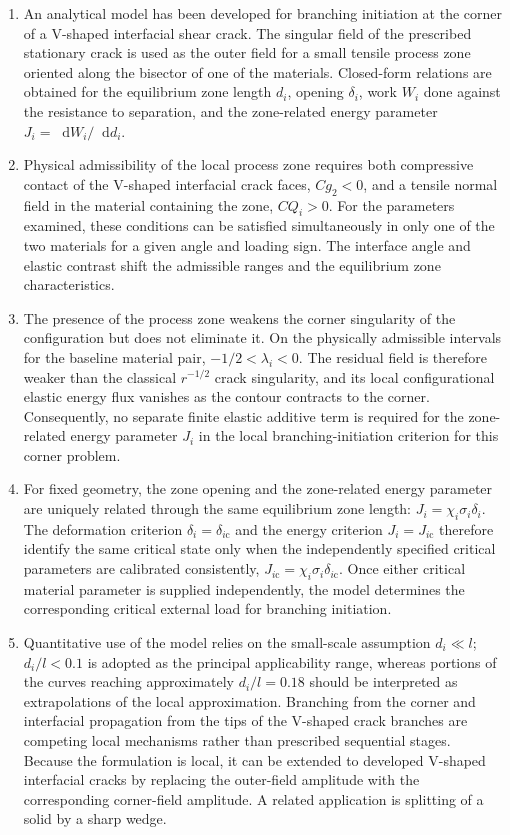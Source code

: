 \documentclass[pdflatex,iicol,sn-mathphys-ay]{sn-jnl}
\newcommand{\dd}{\mathop{}\!\mathrm{d}}
\begin{document}
\begin{enumerate}
\item
An analytical model has been developed for branching initiation at the
corner of a V-shaped interfacial shear crack. The singular field of the
prescribed stationary crack is used as the outer field for a small tensile
process zone oriented along the bisector of one of the materials.
Closed-form relations are obtained for the equilibrium zone length $d_i$,
opening $\delta_i$, work $W_i$ done against the resistance to separation,
and the zone-related energy parameter $J_i=\dd W_i/\dd d_i$.

\item
Physical admissibility of the local process zone requires both compressive
contact of the V-shaped interfacial crack faces, $Cg_2<0$, and a tensile
normal field in the material containing the zone, $CQ_i>0$. For the
parameters examined, these conditions can be satisfied simultaneously in
only one of the two materials for a given angle and loading sign. The
interface angle and elastic contrast shift the admissible ranges and the
equilibrium zone characteristics.

\item
The presence of the process zone weakens the corner singularity of the
configuration but does not eliminate it. On the physically admissible intervals for the baseline
material pair, $-1/2<\lambda_i<0$. The residual field is therefore weaker
than the classical $r^{-1/2}$ crack singularity, and its local
configurational elastic energy flux vanishes as the contour contracts to
the corner. Consequently, no separate finite elastic additive term is required for the
zone-related energy parameter $J_i$ in the local branching-initiation
criterion for this corner problem.

\item
For fixed geometry, the zone opening and the zone-related energy parameter
are uniquely related through the same equilibrium zone length:
$J_i=\chi_i\sigma_i\delta_i$. The deformation criterion
$\delta_i=\delta_{i\mathrm{c}}$ and the energy criterion
$J_i=J_{i\mathrm{c}}$ therefore identify the same critical state only
when the independently specified critical parameters are calibrated
consistently,
$J_{i\mathrm{c}}=\chi_i\sigma_i\delta_{i\mathrm{c}}$. Once either
critical material parameter is supplied independently, the model determines
the corresponding critical external load for branching initiation.

\item
Quantitative use of the model relies on the small-scale assumption
$d_i\ll l$; $d_i/l<0.1$ is adopted as the principal applicability range,
whereas portions of the curves reaching approximately $d_i/l=0.18$ should
be interpreted as extrapolations of the local approximation. Branching
from the corner and interfacial propagation from the tips of the V-shaped crack
branches are competing local mechanisms rather than prescribed
sequential stages. Because the formulation is local, it can be extended
to developed V-shaped interfacial cracks by replacing the outer-field
amplitude with the corresponding corner-field amplitude. A related
application is splitting of a solid by a sharp wedge.
\end{enumerate}
\end{document}

